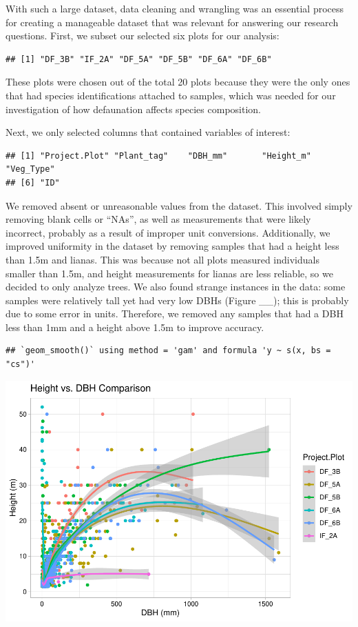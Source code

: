 \documentclass[
  12pt,
]{article}
\begin{document}
With such a large dataset, data cleaning and wrangling was an essential
process for creating a manageable dataset that was relevant for
answering our research questions. First, we subset our selected six
plots for our analysis:

\begin{verbatim}
## [1] "DF_3B" "IF_2A" "DF_5A" "DF_5B" "DF_6A" "DF_6B"
\end{verbatim}

These plots were chosen out of the total 20 plots because they were the
only ones that had species identifications attached to samples, which
was needed for our investigation of how defaunation affects species
composition.

Next, we only selected columns that contained variables of interest:

\begin{verbatim}
## [1] "Project.Plot" "Plant_tag"    "DBH_mm"       "Height_m"     "Veg_Type"    
## [6] "ID"
\end{verbatim}

We removed absent or unreasonable values from the dataset. This involved
simply removing blank cells or ``NAs'', as well as measurements that
were likely incorrect, probably as a result of improper unit
conversions. Additionally, we improved uniformity in the dataset by
removing samples that had a height less than 1.5m and lianas. This was
because not all plots measured individuals smaller than 1.5m, and height
measurements for lianas are less reliable, so we decided to only analyze
trees. We also found strange instances in the data: some samples were
relatively tall yet had very low DBHs (Figure \_\_); this is probably
due to some error in units. Therefore, we removed any samples that had a
DBH less than 1mm and a height above 1.5m to improve accuracy.

\begin{verbatim}
## `geom_smooth()` using method = 'gam' and formula 'y ~ s(x, bs = "cs")'
\end{verbatim}

\includegraphics{GoldenGriffithsKnierMalinowski_ENV872_Project_files/figure-latex/plot of DBH vs height-1.pdf}
\end{document}
